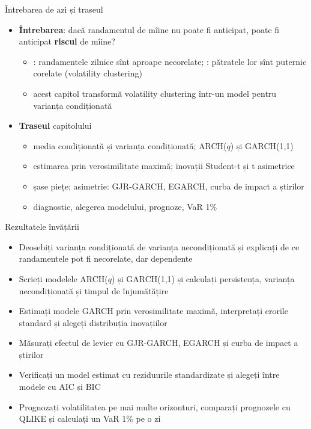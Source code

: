 \begin{frame}{Întrebarea de azi și traseul}
\itemsize{\small}
\begin{itemize}
    \item \textbf{Întrebarea}: dacă randamentul de mîine nu poate fi anticipat, poate fi anticipat \textbf{riscul} de mîine?
    \begin{itemize}
        \item {}: randamentele zilnice sînt aproape necorelate; : pătratele lor sînt puternic corelate (volatility clustering)
        \item acest capitol transformă volatility clustering într-un model pentru varianța condiționată
    \end{itemize}
    \item \textbf{Traseul} capitolului
    \begin{itemize}
        \item media condiționată și varianța condiționată; ARCH($q$) și GARCH(1,1)
        \item estimarea prin verosimilitate maximă; inovații Student-t și t asimetrice
        \item șase piețe; asimetrie: GJR-GARCH, EGARCH, curba de impact a știrilor
        \item diagnostic, alegerea modelului, prognoze, VaR 1\%
    \end{itemize}
\end{itemize}
\end{frame}

\begin{frame}{Rezultatele învățării}
\itemsize{\small}
\begin{itemize}
    \item Deosebiți varianța condiționată de varianța necondiționată și explicați de ce randamentele pot fi necorelate, dar dependente
    \item Scrieți modelele ARCH($q$) și GARCH(1,1) și calculați persistența, varianța necondiționată și timpul de înjumătățire
    \item Estimați modele GARCH prin verosimilitate maximă, interpretați erorile standard și alegeți distribuția inovațiilor
    \item Măsurați efectul de levier cu GJR-GARCH, EGARCH și curba de impact a știrilor
    \item Verificați un model estimat cu reziduurile standardizate și alegeți între modele cu AIC și BIC
    \item Prognozați volatilitatea pe mai multe orizonturi, comparați prognozele cu QLIKE și calculați un VaR 1\% pe o zi
\end{itemize}
\end{frame}


